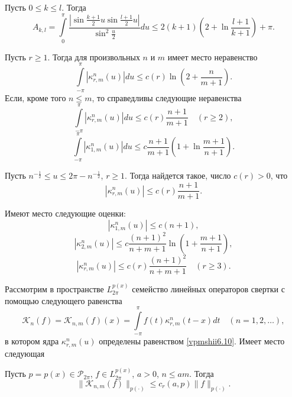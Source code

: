 \begin{lemma}\label{vpmshiil6.2}
  Пусть $0\le k\le l$. Тогда
$$A_{k,l}=\int\limits_{0}^{\pi}\frac{|\sin\frac{k+1}{2}u\sin\frac{l+1}{2}u|}
{\sin^2\frac u2}du\le2(k+1)(2+\ln\frac{l+1}{k+1})+\pi.$$
\end{lemma}

\begin{lemma}\label{vpmshiil6.3}
Пусть $r\ge1$. Тогда для произвольных $n$ и $m$ имеет место неравенство
$$
\int\limits_{-\pi}^{\pi}|\kappa_{r,m}^n(u)|du\le c(r)\ln\left(2+\frac{n}{m+1}\right) .
$$
Если, кроме того $n\le m$, то справедливы  следующие неравенства
$$
\int\limits_{-\pi}^{\pi}|\kappa_{r,m}^n(u)|du\le c(r)\frac{n+1}{m+1}\quad (r\ge2),
$$
$$
\int\limits_{-\pi}^{\pi}|\kappa_{1,m}^n(u)|du\le c\frac{n+1}{m+1}\left(1+\ln\frac{m+1}{n+1}\right).
$$





 \end{lemma}

\begin{lemma}\label{vpmshiil6.4}
 Пусть  $n^{-\frac12}\le u\le2\pi-n^{-\frac12}$, $r\ge1$. Тогда найдется такое,  число $c(r)>0$, что
 $$|\kappa_{r,m}^{n}(u)|\le c(r)\frac{n+1}{m+1}.$$
  \end{lemma}

\begin{lemma}\label{vpmshiil6.5} Имеют место следующие оценки:
 $$|\kappa_{1,m}^{n}(u)|\le c(n+1), $$
 $$
 |\kappa_{2,m}^{n}(u)|\le c\frac{(n+1)^2}{n+m+1}\ln\left(1+\frac{m+1}{n+1}\right),
 $$
 $$
 |\kappa_{r,m}^{n}(u)|\le c(r)\frac{(n+1)^2}{n+m+1}\quad (r\ge3).
 $$
  \end{lemma}

Рассмотрим в пространстве $L^{p(x)}_{2\pi}$ семейство  линейных операторов свертки с помощью следующего равенства
\begin{equation}\label{vpmshii6.42}
    \mathcal{K}_{n}(f)=\mathcal{K}_{n,m}(f)(x)=
\int\limits_{-\pi}^{\pi}f(t)\kappa_{r,m}^{n}(t-x)dt\quad(n=1,2,\ldots),
\end{equation}
в котором ядра $\kappa_{r,m}^{n}(u)$ определены равенством \eqref{vpmshii6.10}. Имеет место следующая

\begin{lemma}\label{vpmshiil6.6}
 Пусть $p=p(x)\in\mathcal{ P}_{2\pi}$, $f\in L^{p(x)}_{2\pi}$, $a>0$, $n\le am$. Тогда
$$\|\mathcal{K}_{n,m}(f)\|_{p(\cdot)}\le c_r(a,p)\|f\|_{p(\cdot)}.$$
  \end{lemma}




